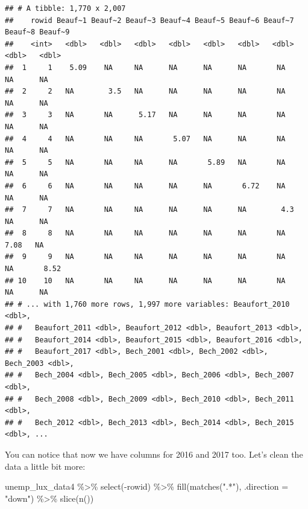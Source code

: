 \documentclass[
]{article}
\newenvironment{Shaded}{\begin{snugshade}}{\end{snugshade}}
\newcommand{\AttributeTok}[1]{\textcolor[rgb]{0.77,0.63,0.00}{#1}}
\newcommand{\FunctionTok}[1]{\textcolor[rgb]{0.00,0.00,0.00}{#1}}
\newcommand{\NormalTok}[1]{#1}
\newcommand{\SpecialCharTok}[1]{\textcolor[rgb]{0.00,0.00,0.00}{#1}}
\newcommand{\StringTok}[1]{\textcolor[rgb]{0.31,0.60,0.02}{#1}}
\begin{document}
\begin{verbatim}
## # A tibble: 1,770 x 2,007
##    rowid Beauf~1 Beauf~2 Beauf~3 Beauf~4 Beauf~5 Beauf~6 Beauf~7 Beauf~8 Beauf~9
##    <int>   <dbl>   <dbl>   <dbl>   <dbl>   <dbl>   <dbl>   <dbl>   <dbl>   <dbl>
##  1     1    5.09    NA     NA      NA      NA      NA       NA     NA      NA   
##  2     2   NA        3.5   NA      NA      NA      NA       NA     NA      NA   
##  3     3   NA       NA      5.17   NA      NA      NA       NA     NA      NA   
##  4     4   NA       NA     NA       5.07   NA      NA       NA     NA      NA   
##  5     5   NA       NA     NA      NA       5.89   NA       NA     NA      NA   
##  6     6   NA       NA     NA      NA      NA       6.72    NA     NA      NA   
##  7     7   NA       NA     NA      NA      NA      NA        4.3   NA      NA   
##  8     8   NA       NA     NA      NA      NA      NA       NA      7.08   NA   
##  9     9   NA       NA     NA      NA      NA      NA       NA     NA       8.52
## 10    10   NA       NA     NA      NA      NA      NA       NA     NA      NA   
## # ... with 1,760 more rows, 1,997 more variables: Beaufort_2010 <dbl>,
## #   Beaufort_2011 <dbl>, Beaufort_2012 <dbl>, Beaufort_2013 <dbl>,
## #   Beaufort_2014 <dbl>, Beaufort_2015 <dbl>, Beaufort_2016 <dbl>,
## #   Beaufort_2017 <dbl>, Bech_2001 <dbl>, Bech_2002 <dbl>, Bech_2003 <dbl>,
## #   Bech_2004 <dbl>, Bech_2005 <dbl>, Bech_2006 <dbl>, Bech_2007 <dbl>,
## #   Bech_2008 <dbl>, Bech_2009 <dbl>, Bech_2010 <dbl>, Bech_2011 <dbl>,
## #   Bech_2012 <dbl>, Bech_2013 <dbl>, Bech_2014 <dbl>, Bech_2015 <dbl>, ...
\end{verbatim}

You can notice that now we have columns for 2016 and 2017 too. Let's clean the data a little bit more:

\begin{Shaded}
\begin{Highlighting}[]
\NormalTok{unemp\_lux\_data4 }\SpecialCharTok{\%\textgreater{}\%} 
  \FunctionTok{select}\NormalTok{(}\SpecialCharTok{{-}}\NormalTok{rowid) }\SpecialCharTok{\%\textgreater{}\%} 
  \FunctionTok{fill}\NormalTok{(}\FunctionTok{matches}\NormalTok{(}\StringTok{".*"}\NormalTok{), }\AttributeTok{.direction =} \StringTok{"down"}\NormalTok{) }\SpecialCharTok{\%\textgreater{}\%} 
  \FunctionTok{slice}\NormalTok{(}\FunctionTok{n}\NormalTok{())}
\end{Highlighting}
\end{Shaded}
\end{document}
